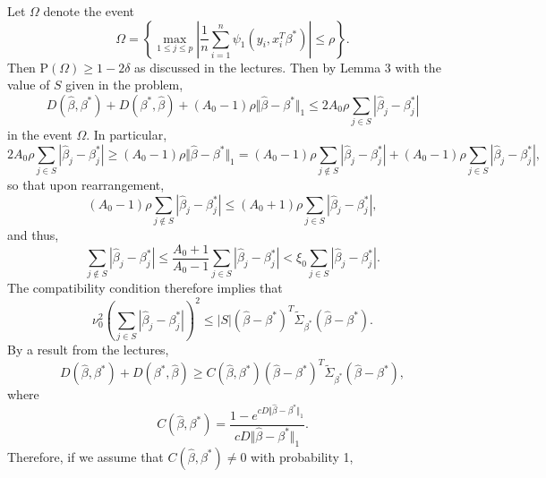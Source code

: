 \documentclass[12pt]{article}
\newcommand{\Prob}{\mathrm{P}}
\begin{document}
\begin{enumerate}
Let $\Omega$ denote the event
\begin{equation*}
\Omega = \left\{\max_{1 \leq j \leq p} \left|\frac{1}{n} \sum_{i=1}^n \psi_1(y_i, x_i^T\beta^*)\right| \leq \rho \right\}.
\end{equation*}
Then $\Prob(\Omega) \geq 1 - 2\delta$ as discussed in the lectures. Then by Lemma 3 with the value of $S$ given in the problem,
\begin{equation*}
D(\hat{\beta}, \beta^*) + D(\beta^*, \hat{\beta}) + (A_0 - 1) \rho \Vert \hat{\beta} - \beta^* \Vert_1 \leq 2A_0 \rho \sum_{j \in S} |\hat{\beta}_j - \beta^*_j|
\end{equation*}
in the event $\Omega$. In particular,
\begin{equation*}
 2A_0 \rho \sum_{j \in S} |\hat{\beta}_j - \beta^*_j| \geq (A_0 - 1) \rho \Vert \hat{\beta} - \beta^* \Vert_1 = (A_0 - 1) \rho \sum_{j \not \in S} |\hat{\beta}_j - \beta^*_j| + (A_0 - 1) \rho \sum_{j \in S} |\hat{\beta}_j - \beta^*_j|,
\end{equation*}
so that upon rearrangement,
\begin{equation*}
(A_0 - 1) \rho \sum_{j \not \in S} |\hat{\beta}_j - \beta^*_j| \leq (A_0 + 1) \rho \sum_{j \in S} |\hat{\beta}_j - \beta^*_j|,
\end{equation*}
and thus,
\begin{equation*}
\sum_{j \not \in S} |\hat{\beta}_j - \beta^*_j| \leq \frac{A_0 + 1}{A_0 - 1} \sum_{j \in S} |\hat{\beta}_j - \beta^*_j| < \xi_0 \sum_{j \in S} |\hat{\beta}_j - \beta^*_j|.
\end{equation*}
The compatibility condition therefore implies that
\begin{equation*}
\nu_0^2 \left(\sum_{j \in S} |\hat{\beta}_j - \beta^*_j|\right)^2 \leq |S| (\hat{\beta} - \beta^*)^T \widetilde{\Sigma}_{\beta^*} (\hat{\beta} - \beta^*).
\end{equation*}
By a result from the lectures,
\begin{equation*}
D(\hat{\beta}, \beta^*) + D(\beta^*, \hat{\beta}) \geq C(\hat{\beta}, \beta^*) (\hat{\beta} - \beta^*)^T \widetilde{\Sigma}_{\beta^*} (\hat{\beta} - \beta^*),
\end{equation*}
where
\begin{equation*}
C(\hat{\beta}, \beta^*) = \frac{1 - e^{cD\Vert \hat{\beta} - \beta^* \Vert_1}}{cD\Vert \hat{\beta} - \beta^* \Vert_1}.
\end{equation*}
Therefore, if we assume that $C(\hat{\beta}, \beta^*) \neq 0$ with probability 1,
\begin{align*}

\end{align*}
\end{enumerate}
\end{document}
